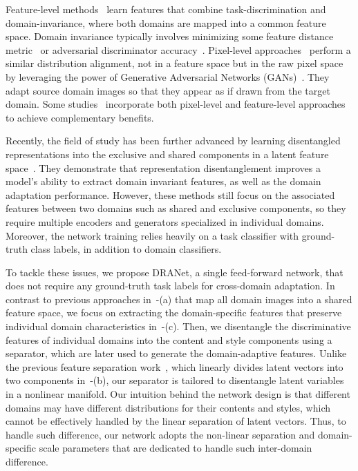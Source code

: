 \documentclass[final]{cvpr}
\begin{document}
Feature-level methods~\cite{tzeng2014deep,long2015learning,sun2016deep,tzeng2015simultaneous,ganin2016domain,sun2016deep,tzeng2017adversarial} learn features that combine task-discrimination and domain-invariance, where both domains are mapped into a common feature space.
Domain invariance typically involves minimizing some feature distance metric~\cite{tzeng2014deep,long2015learning,sun2016deep} or adversarial discriminator accuracy~\cite{ganin2016domain}.
Pixel-level approaches~\cite{liu2016coupled,bousmalis2017unsupervised} perform a similar distribution alignment, not in a feature space but in the raw pixel space by leveraging the power of Generative Adversarial Networks (GANs)~\cite{goodfellow2014generative, mirza2014conditional, radford2015unsupervised, salimans2016improved, chen2016infogan}.
They adapt source domain images so that they appear as if drawn from the target domain.
Some studies~\cite{hoffman2018cycada,tran2019gotta,ye2020light} incorporate both pixel-level and feature-level approaches to achieve complementary benefits.

Recently, the field of study has been further advanced by learning disentangled representations into the exclusive and shared components in a latent feature space~\cite{bousmalis2016domain,gonzalez2018image,liu2018detach,zou2020joint}.
They demonstrate that representation disentanglement improves a model's ability to extract domain invariant features, as well as the domain adaptation performance.
However, these methods still focus on the associated features between two domains such as shared and exclusive components, so they require multiple encoders and generators specialized in individual domains.
Moreover, the network training relies heavily on a task classifier with ground-truth class labels, in addition to domain classifiers.



To tackle these issues, we propose DRANet, a single feed-forward network, that does not require any ground-truth task labels for cross-domain adaptation.
In contrast to previous approaches in~-(a) that map all domain images into a shared feature space, we focus on extracting the domain-specific features that preserve individual domain characteristics in~-(c).
Then, we disentangle the discriminative features of individual domains into the content and style components using a separator, which are later used to generate the domain-adaptive features.
Unlike the previous feature separation work~\cite{zhang2018style}, which linearly divides latent vectors into two components in~-(b), our separator is tailored to disentangle latent variables in a nonlinear manifold.
Our intuition behind the network design is that different domains may have different distributions for their contents and styles, which cannot be effectively handled by the linear separation of latent vectors.
Thus, to handle such difference, our network adopts the non-linear separation and domain-specific scale parameters that are dedicated to handle such inter-domain difference.
\end{document}
